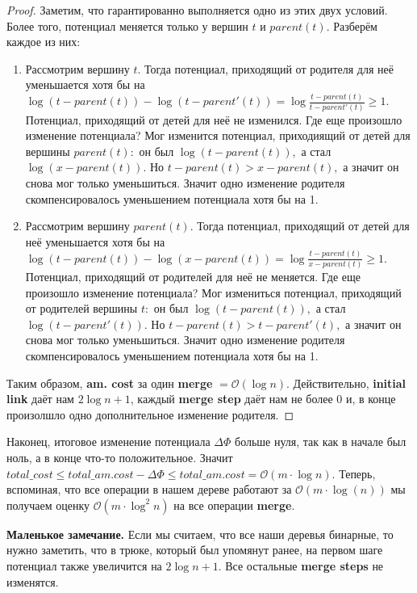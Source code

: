 \begin{proof}
Заметим, что гарантированно выполняется одно из этих двух условий. Более того, потенциал меняется только у вершин $t$ и $parent(t).$ Разберём каждое из них:
\begin{enumerate}
    \item Рассмотрим вершину $t.$ Тогда потенциал, приходящий от родителя для неё уменьшается хотя бы на $\log{(t - parent(t))} - \log{(t - parent'(t))} = \log{\frac{t - parent(t)}{t - parent'(t)}}\geqslant 1.$ Потенциал, приходящий от детей для неё не изменился. Где еще произошло изменение потенциала? Мог изменится потенциал, приходиящий от детей для вершины $parent(t):$ он был $\log{(t - parent(t))},$ а стал $\log{(x - parent(t))}.$ Но $t - parent(t) > x - parent(t),$ а значит он снова мог только уменьшиться. Значит одно изменение родителя скомпенсировалось уменьшением потенциала хотя бы на 1.
    
    \item Рассмотрим вершину $parent(t).$ Тогда потенциал, приходящий от детей для неё уменьшается хотя бы на $\log{(t - parent(t))} - \log{(x - parent(t))} = \log{\frac{t - parent(t)}{x - parent(t)}} \geqslant 1.$ Потенциал, приходящий от родителей для неё не меняется. Где еще произошло изменение потенциала? Мог измениться потенциал, приходящий от родителей вершины $t:$ он был $\log{(t - parent(t))},$ а стал $\log{(t - parent'(t))}.$ Но $t - parent(t) > t - parent'(t),$ а значит он снова мог только уменьшиться. Значит одно изменение родителя скомпенсировалось уменьшением потенциала хотя бы на 1.
\end{enumerate}
Таким образом, \textbf{am. cost} за один \textbf{merge} $=\mathcal{O}(\log{n})$. Действительно, \textbf{initial link} даёт нам $2\log{n} + 1$, каждый \textbf{merge step} даёт нам не более 0 и, в конце произолшло одно дополнительное изменение родителя.
\end{proof}

Наконец, итоговое изменение потенциала $\Delta\Phi$ больше нуля, так как в начале был ноль, а в конце что-то положительное. Значит $total\_cost \leqslant total\_am.cost - \Delta\Phi \leqslant total\_am.cost = \mathcal{O}(m\cdot\log{n}).$ Теперь, вспоминая, что все операции в нашем дереве работают за $\mathcal{O}(m\cdot\log(n))$ мы получаем оценку $\mathcal{O}(m\cdot\log^2{n})$ на все операции \textbf{merge}.

\textbf{Маленькое замечание.} Если мы считаем, что все наши деревья бинарные, то нужно заметить, что в трюке, который был упомянут ранее, на первом шаге потенциал также увеличится на $2\log{n} + 1.$ Все остальные \textbf{merge steps} не изменятся.

